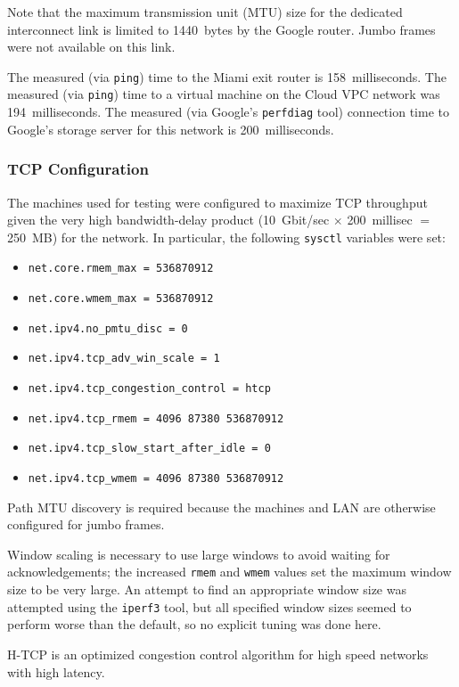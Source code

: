Note that the maximum transmission unit (MTU) size for the dedicated interconnect link is limited to 1440~bytes by the Google router.
Jumbo frames were not available on this link.

The measured (via \texttt{ping}) time to the Miami exit router is 158~milliseconds.
The measured (via \texttt{ping}) time to a virtual machine on the Cloud VPC network was 194~milliseconds.
The measured (via Google's \texttt{perfdiag} tool) connection time to Google's storage server for this network is 200~milliseconds.

\subsubsection{TCP Configuration}

The machines used for testing were configured to maximize TCP throughput given the very high bandwidth-delay product (10~Gbit/sec $\times$ 200~millisec $=$ 250~MB) for the network.
In particular, the following \texttt{sysctl} variables were set:
\begin{itemize}
\item \texttt{net.core.rmem\_max = 536870912}
\item \texttt{net.core.wmem\_max = 536870912}
\item \texttt{net.ipv4.no\_pmtu\_disc = 0}
\item \texttt{net.ipv4.tcp\_adv\_win\_scale = 1}
\item \texttt{net.ipv4.tcp\_congestion\_control = htcp}
\item \texttt{net.ipv4.tcp\_rmem = 4096 87380 536870912}
\item \texttt{net.ipv4.tcp\_slow\_start\_after\_idle = 0}
\item \texttt{net.ipv4.tcp\_wmem = 4096 87380 536870912}
\end{itemize}

Path MTU discovery is required because the machines and LAN are otherwise configured for jumbo frames.

Window scaling is necessary to use large windows to avoid waiting for acknowledgements; the increased \texttt{rmem} and \texttt{wmem} values set the maximum window size to be very large.
An attempt to find an appropriate window size was attempted using the \texttt{iperf3} tool, but all specified window sizes seemed to perform worse than the default, so no explicit tuning was done here.

H-TCP is an optimized congestion control algorithm for high speed networks with high latency.

